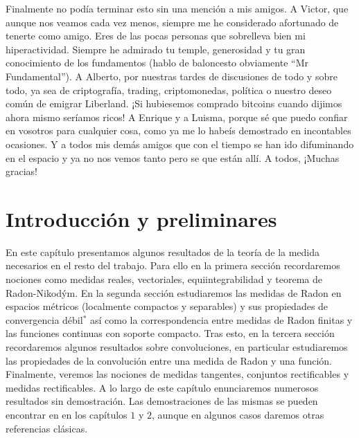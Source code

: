 \documentclass[a4paper,11pt,spanish, twoside, leqno]{tfm-uam}
\begin{document}
\begin{agradecimientos}
Finalmente no podía terminar esto sin una mención a mis amigos. A Victor, que aunque nos veamos cada vez menos, siempre me he considerado afortunado de tenerte como amigo. Eres de las pocas personas que sobrelleva bien mi hiperactividad. Siempre he admirado tu temple, generosidad  y tu gran conocimiento de los fundamentos (hablo de baloncesto obviamente ``Mr Fundamental''). A Alberto, por nuestras tardes de discusiones de todo y sobre todo, ya sea de criptografía, trading, criptomonedas, política o nuestro deseo común de emigrar Liberland. ¡Si hubiesemos comprado bitcoins cuando dijimos ahora mismo seríamos ricos! A Enrique y a Luisma, porque sé que puedo confiar en vosotros para cualquier cosa, como ya me lo habeís demostrado en incontables ocasiones. Y a todos mis demás amigos que con el tiempo se han ido difuminando en el espacio y ya no nos vemos tanto pero se que están allí. A todos, ¡Muchas gracias!

\end{agradecimientos}



\makeindexes
\mainmatter

\printunsrtglossary[type=notation, style= mcolalttreegroup, title={Lista de Símbolos}]
\printunsrtglossary[type=symbols, style= mcolalttreegroup, title={List of Symbols}]
\chapter{Introducción y preliminares}\label{cap:cap1}
\setcounter{page}{1}

En este capítulo presentamos algunos resultados de la teoría de la medida necesarios en el resto del trabajo. Para ello en la primera sección recordaremos nociones como medidas reales, vectoriales, equiintegrabilidad y  teorema de Radon-Nikod\'ym. En la segunda sección estudiaremos las medidas de Radon en espacios métricos (localmente compactos y separables) y sus propiedades de convergencia débil$^{*}$ así como la correspondencia entre medidas de Radon finitas y las funciones continuas con soporte compacto. Tras esto, en la tercera sección recordaremos algunos resultados sobre convoluciones, en particular estudiaremos las propiedades de la convolución entre una medida de Radon y una función. Finalmente, veremos las nociones de medidas tangentes, conjuntos rectificables y medidas rectificables. A lo largo de este capítulo enunciaremos numerosos resultados sin demostración. Las demostraciones de las mismas se pueden encontrar en \cite{ambrosio2000functions} en los capítulos $1$ y $2$, aunque en algunos casos daremos otras referencias clásicas.
\end{document}
